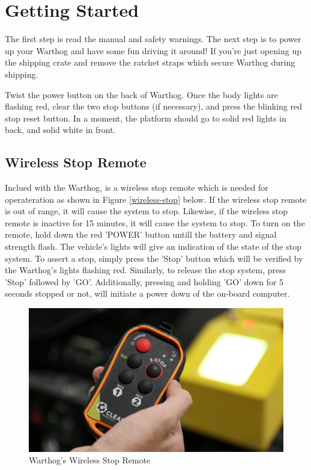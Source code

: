 \documentclass[]{clearpath-latex/clearpath-manual}
\begin{document}
\section{Getting Started}

The first step is read the manual and safety warnings.  The next step is to power up your Warthog and have some fun driving it around! If you’re just opening up the shipping crate and remove the ratchet straps which secure Warthog during shipping.

Twist the power button on the back of Warthog. Once the body lights are flashing red, clear the two stop buttons (if necessary), and press the blinking red stop reset button. In a moment, the platform should go to solid red lights in back, and solid white in front.

\subsection{Wireless Stop Remote}

Inclued with the Warthog, is a wireless stop remote which is needed for operateration as shown in Figure \autoref{wireless-stop} below.
If the wireless stop remote is out of range, it will cause the system to stop.
Likewise, if the wireless stop remote is inactive for 15 minutes, it will cause the system to stop.
To turn on the remote, hold down the red 'POWER' button untill the battery and signal strength flash.
The vehicle's lights will give an indication of the state of the stop system.
To assert a stop, simply press the 'Stop' button which will be verified by the Warthog's lights flashing red.
Similarly, to release the stop system, press 'Stop' followed by 'GO'.
Additionally, pressing and holding 'GO' down for 5 seconds stopped or not, will initiate a power down of the on-board computer.

\begin{figure}[!h]
  \centering
  \includegraphics[width=1.0\linewidth]{wireless-stop-remote.png}
  \caption{Warthog's Wireless Stop Remote}
  \label{wireless-stop}
\end{figure}
\end{document}
